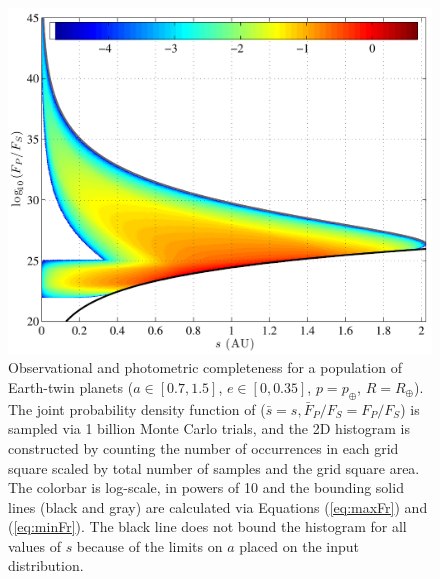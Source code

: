\begin{figure}[ht]
\centering
\includegraphics[width=5.5in]{./figures/earthTwin_pdf}
 \caption[Earth-twin observation PDF]{ Observational and photometric completeness for a population of Earth-twin planets ($a \in [0.7, 1.5]$, $e \in [0, 0.35]$, $p = p_\oplus$, $R = R_\oplus$).  The joint probability density function of ($\bar s = s,\bar F_P/F_S = F_P/F_S$) is sampled via 1 billion Monte Carlo trials, and the 2D histogram is constructed by counting the number of occurrences in each grid square scaled by total number of samples and the grid square area. The colorbar is log-scale, in powers of 10 and the bounding solid lines (black and gray) are calculated via Equations (\ref{eq:maxFr}) and (\ref{eq:minFr}).  The black line does not bound the histogram for all values of $s$ because of the limits on $a$ placed on the input distribution.}
\label{fig:earthTwin_pdf} 
\end{figure} 

